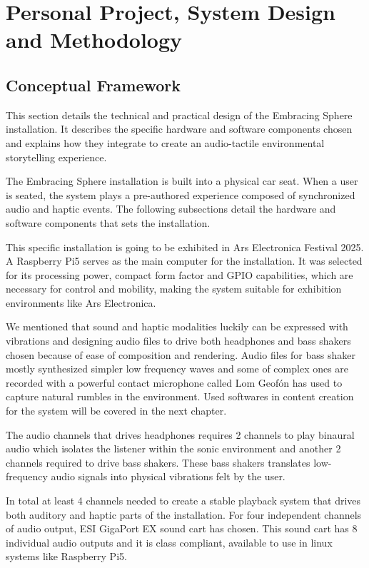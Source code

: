 \chapter{Personal Project, System Design and Methodology}
    \section{Conceptual Framework}
        This section details the technical and practical design of the Embracing Sphere installation. It describes the specific hardware and software components chosen and explains how they integrate to create an audio-tactile environmental storytelling experience.\par

        The Embracing Sphere installation is built into a physical car seat. When a user is seated, the system plays a pre-authored experience composed of synchronized audio and haptic events. The following subsections detail the hardware and software components that sets the installation.\par

        This specific installation is going to be exhibited in Ars Electronica Festival 2025. A Raspberry Pi5 serves as the main computer for the installation. It was selected for its processing power, compact form factor and GPIO capabilities, which are necessary for control and mobility, making the system suitable for exhibition environments like Ars Electronica.\par

        We mentioned that sound and haptic modalities luckily can be expressed with vibrations and  designing audio files to drive both headphones and bass shakers chosen because of ease of composition and rendering. Audio files for bass shaker mostly synthesized simpler low frequency waves and some of complex ones are recorded with a powerful contact microphone called Lom Geofón has used to capture natural rumbles in the environment. Used softwares in content creation for the system will be covered in the next chapter.\par

        The audio channels that drives headphones requires 2 channels to play binaural audio which isolates the listener within the sonic environment and another 2 channels required to drive bass shakers. These bass shakers translates low-frequency audio signals into physical vibrations felt by the user.\par

        In total at least 4 channels needed to create a stable playback system that drives both auditory and haptic parts of the installation. For four independent channels of audio output, ESI GigaPort EX sound cart has chosen. This sound cart has 8 individual audio outputs and it is class compliant, available to use in linux systems like Raspberry Pi5.\par

